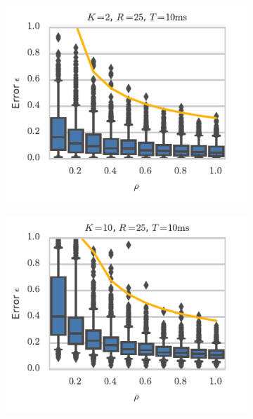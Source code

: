 \begin{figure}[t!]
\begin{subfigure}[b]{2.75in}
 \end{subfigure}
 \\
 \vspace{-.25in}
 \begin{subfigure}[b]{2.75in}
   \centering
   \includegraphics[width=\textwidth]{figures/ch9/error_vs_rho_K2}
   \label{fig:error_vs_rho_K2}
 \end{subfigure}
 \begin{subfigure}[b]{2.75in}
   \centering
   \includegraphics[width=\textwidth]{figures/ch9/error_vs_rho_K10}
   \label{fig:error_vs_rho_K10}

\end{subfigure}
\end{figure}
